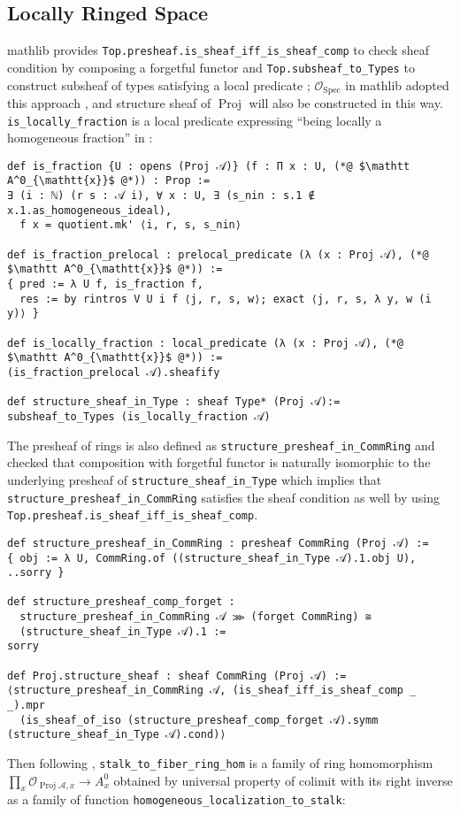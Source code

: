\documentclass[a4paper,UKenglish,cleveref, autoref, thm-restate]{lipics-v2021}
\begin{document}
\subsection{Locally Ringed Space}
\textsf{mathlib} provides \lstinline{Top.presheaf.is_sheaf_iff_is_sheaf_comp} to check sheaf condition by composing a forgetful functor and \lstinline{Top.subsheaf_to_Types} to construct subsheaf of types satisfying a local predicate \cite{mathlibrepo}; $\mathcal{O}_{\operatorname{Spec}}$ in \textsf{mathlib} adopted this approach \cite{mathlibrepo}, and structure sheaf of $\operatorname{Proj}$ will also be constructed in this way. \lstinline{is_locally_fraction} is a local predicate expressing ``being locally a homogeneous fraction'' in :

\begin{lstlisting}
def is_fraction {U : opens (Proj 𝒜)} (f : Π x : U, (*@ $\mathtt A^0_{\mathtt{x}}$ @*)) : Prop :=
∃ (i : ℕ) (r s : 𝒜 i), ∀ x : U, ∃ (s_nin : s.1 ∉ x.1.as_homogeneous_ideal),
  f x = quotient.mk' ⟨i, r, s, s_nin⟩

def is_fraction_prelocal : prelocal_predicate (λ (x : Proj 𝒜), (*@ $\mathtt A^0_{\mathtt{x}}$ @*)) :=
{ pred := λ U f, is_fraction f,
  res := by rintros V U i f ⟨j, r, s, w⟩; exact ⟨j, r, s, λ y, w (i y)⟩ }

def is_locally_fraction : local_predicate (λ (x : Proj 𝒜), (*@ $\mathtt A^0_{\mathtt{x}}$ @*)) :=
(is_fraction_prelocal 𝒜).sheafify

def structure_sheaf_in_Type : sheaf Type* (Proj 𝒜):=
subsheaf_to_Types (is_locally_fraction 𝒜)
\end{lstlisting}

The presheaf of rings is also defined as \lstinline{structure_presheaf_in_CommRing} and checked that composition with forgetful functor is naturally isomorphic to the underlying presheaf of \lstinline{structure_sheaf_in_Type} which implies that \lstinline{structure_presheaf_in_CommRing} satisfies the sheaf condition as well by using \lstinline{Top.presheaf.is_sheaf_iff_is_sheaf_comp}.
\begin{lstlisting}
def structure_presheaf_in_CommRing : presheaf CommRing (Proj 𝒜) :=
{ obj := λ U, CommRing.of ((structure_sheaf_in_Type 𝒜).1.obj U), ..sorry }

def structure_presheaf_comp_forget :
  structure_presheaf_in_CommRing 𝒜 ⋙ (forget CommRing) ≅ 
  (structure_sheaf_in_Type 𝒜).1 := 
sorry

def Proj.structure_sheaf : sheaf CommRing (Proj 𝒜) :=
⟨structure_presheaf_in_CommRing 𝒜, (is_sheaf_iff_is_sheaf_comp _ _).mpr
  (is_sheaf_of_iso (structure_presheaf_comp_forget 𝒜).symm (structure_sheaf_in_Type 𝒜).cond)⟩
\end{lstlisting}
Then following , \lstinline{stalk_to_fiber_ring_hom} is a family of ring homomorphism $\prod_x \mathcal{O}_{\operatorname{Proj}\mathcal A, x}\to A^0_x$ obtained by universal property of colimit with its right inverse as a family of function \lstinline{homogeneous_localization_to_stalk}:
\end{document}
